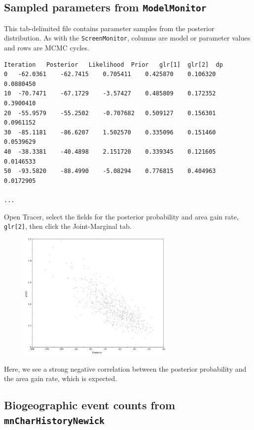 \documentclass[11pt]{article}
\begin{document}
\subsection{Sampled parameters from {\tt ModelMonitor}}

This tab-delimited file contains parameter samples from the posterior distribution.
As with the {\tt ScreenMonitor}, columns are model or parameter values and rows are MCMC cycles.

\begin{framed}
\begin{lstlisting}[basicstyle=\tiny \listingsfont, columns=texcl]
Iteration	Posterior	Likelihood	Prior	glr[1]	glr[2]	dp
0	-62.0361	-62.7415	0.705411	0.425870	0.106320	0.0880450
10	-70.7471	-67.1729	-3.57427	0.485809	0.172352	0.3900410
20	-55.9579	-55.2502	-0.707682	0.509127	0.156301	0.0961152
30	-85.1181	-86.6207	1.502570	0.335096	0.151460	0.0539629
40	-38.3381	-40.4898	2.151720	0.339345	0.121605	0.0146533
50	-93.5820	-88.4990	-5.08294	0.776815	0.404963	0.0172905

...
\end{lstlisting}
\end{framed}

Open Tracer, select the fields for the posterior probability and area gain rate, {\tt glr[2]}, then click the Joint-Marginal tab.

\begin{figure}[H]
\centering
\includegraphics[width=3in]{figures/joint_rgain_posterior}
\end{figure}

Here, we see a strong negative correlation between the posterior probability and the area gain rate, which is expected.

\subsection{Biogeographic event counts from {\tt mnCharHistoryNewick}}
\end{document}
